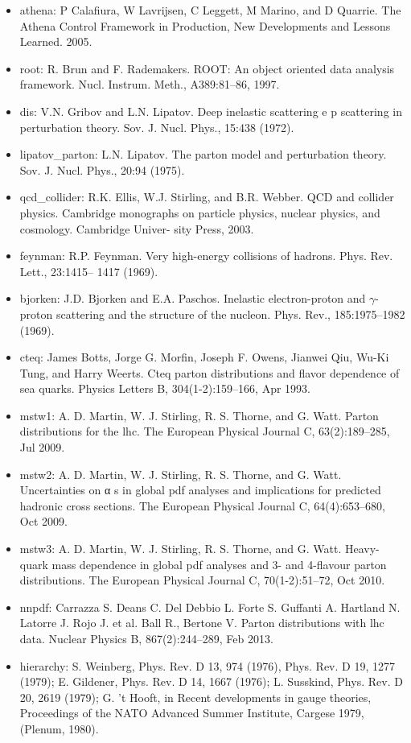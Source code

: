 \begin{itemize}
	\item athena: P Calafiura, W Lavrijsen, C Leggett, M Marino, and D Quarrie. The Athena 	Control Framework in Production, New Developments and Lessons Learned. 	2005.
	\item root: R. Brun and F. Rademakers. ROOT: An object oriented data analysis framework. Nucl. Instrum. Meth., A389:81–86, 1997.
	\item dis: V.N. Gribov and L.N. Lipatov. Deep inelastic scattering e p scattering in perturbation theory. Sov. J. Nucl. Phys., 15:438 (1972).
	\item lipatov\_parton: L.N. Lipatov. The parton model and perturbation theory. Sov. J. Nucl. Phys., 20:94
	(1975).
	\item qcd\_collider: R.K. Ellis, W.J. Stirling, and B.R. Webber. QCD and collider physics. Cambridge
	monographs on particle physics, nuclear physics, and cosmology. Cambridge Univer-
	sity Press, 2003.
	\item feynman: R.P. Feynman. Very high-energy collisions of hadrons. Phys. Rev. Lett., 23:1415–
	1417 (1969).
	\item bjorken: J.D. Bjorken and E.A. Paschos. Inelastic electron-proton and $\gamma$-proton scattering
	and the structure of the nucleon. Phys. Rev., 185:1975–1982 (1969).
	\item cteq: James Botts, Jorge G. Morfin, Joseph F. Owens, Jianwei Qiu, Wu-Ki Tung,
	and Harry Weerts. Cteq parton distributions and flavor dependence of sea
	quarks. Physics Letters B, 304(1-2):159–166, Apr 1993.
	\item mstw1: A. D. Martin, W. J. Stirling, R. S. Thorne, and G. Watt. Parton distributions
	for the lhc. The European Physical Journal C, 63(2):189–285, Jul 2009.
	\item mstw2: A. D. Martin, W. J. Stirling, R. S. Thorne, and G. Watt. Uncertainties on α s
	in global pdf analyses and implications for predicted hadronic cross sections.
	The European Physical Journal C, 64(4):653–680, Oct 2009.
	\item mstw3: A. D. Martin, W. J. Stirling, R. S. Thorne, and G. Watt. Heavy-quark mass
	dependence in global pdf analyses and 3- and 4-flavour parton distributions.
	The European Physical Journal C, 70(1-2):51–72, Oct 2010.
	\item nnpdf:  Carrazza S. Deans C. Del Debbio L. Forte S. Guffanti A. Hartland N. Latorre
	J. Rojo J. et al. Ball R., Bertone V. Parton distributions with lhc data. Nuclear
	Physics B, 867(2):244–289, Feb 2013.
	\item hierarchy:  S. Weinberg, Phys. Rev. D 13, 974 (1976), Phys. Rev. D 19, 1277 (1979); E. Gildener, Phys. Rev. D 14, 1667 (1976); L. Susskind, Phys. Rev. D 20, 2619 (1979); G. ’t Hooft, in Recent developments in gauge theories, Proceedings of the NATO Advanced Summer Institute, Cargese 1979, (Plenum, 1980).

\end{itemize}


